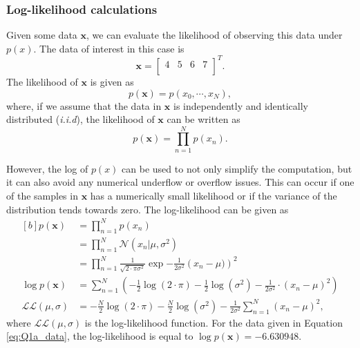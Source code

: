 \documentclass{article}
\begin{document}
\subsubsection{Log-likelihood calculations}

Given some data $\mathbf{x}$, we can evaluate the likelihood of observing this data under $p(x)$. The data of interest in this case is
\begin{equation}\label{eq:Q1a_data}
\mathbf{x} = 
\begin{bmatrix}
 4 & 5 & 6 & 7 \\
\end{bmatrix}^T.
\end{equation}
The likelihood of $\mathbf{x}$ is given as
\begin{equation}
    p(\mathbf{x}) = p(x_0, \cdots, x_N),
\end{equation}
where, if we assume that the data in $\mathbf{x}$ is independently and  identically distributed (\emph{i.i.d}), the likelihood of $\mathbf{x}$ can be written as
\begin{equation}
    p(\mathbf{x}) = \prod_{n=1}^{N}p(x_n).
\end{equation}

However, the log of $p(x)$ can be used to not only simplify the computation, but it can also avoid any numerical underflow or overflow issues. This can occur if one of the samples in $\mathbf{x}$ has a numerically small likelihood or if the variance of the distribution tends towards zero. The log-likelihood can be given as
 \begin{equation}\label{eq:Q1_log_likelihood}
 \begin{aligned}[b]
 p(\mathbf{x}) &= \prod_{n=1}^{N} p(x_n) \\
 &= \prod_{n=1}^{N}\mathcal{N}(x_n \vert \mu, \sigma^2) \\
 &= \prod_{n=1}^{N}\frac{1}{\sqrt{2\cdot\pi \sigma^2}}\exp{-\frac{1}{2\sigma^2} \left( x_n - \mu)\right)^2} \\
 \log p(\mathbf{x}) &= \sum_{n=1}^{N} \left(-\frac{1}{2} \log(2\cdot\pi) - \frac{1}{2}\log(\sigma^2) - \frac{1}{2\sigma^2} \cdot (x_n - \mu)^2 \right) \\
\mathcal{LL}(\mu, \sigma) &= -\frac{N}{2} \log(2\cdot\pi) - \frac{N}{2}\log(\sigma^2) - \frac{1}{2\sigma^2} \sum_{n=1}^{N} (x_n - \mu)^2,
 \end{aligned}
 \end{equation}
 where $\mathcal{LL}(\mu, \sigma)$ is the log-likelihood function. For the data given in Equation \eqref{eq:Q1a_data}, the log-likelihood is equal to $ \log p(\mathbf{x}) = -6.630948$.
 
\end{document}
